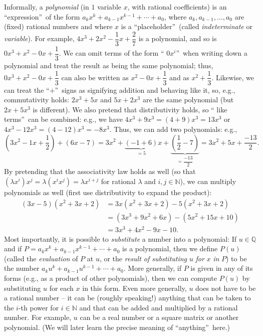\documentclass[numbers=enddot,12pt,final,onecolumn,notitlepage]{scrartcl}%
\numberwithin{exer}{subsection}
\theoremstyle{definition}
\begin{document}
Informally, a \textit{polynomial} (in $1$ variable $x$, with rational
coefficients) is an \textquotedblleft expression\textquotedblright\ of the
form $a_{k}x^{k}+a_{k-1}x^{k-1}+\cdots+a_{0}$, where $a_{k},a_{k-1}%
,\ldots,a_{0}$ are (fixed) rational numbers and where $x$ is a
\textquotedblleft placeholder\textquotedblright\ (called
\textit{indeterminate} or \textit{variable}). For example, $4x^{3}%
+2x^{2}-\dfrac{1}{3}x+\dfrac{2}{7}$ is a polynomial, and so is $0x^{3}%
+x^{2}-0x+\dfrac{1}{3}$. We can omit terms of the form \textquotedblleft%
$0x^{i}$\textquotedblright\ when writing down a polynomial and treat the
result as being the same polynomial; thus, $0x^{3}+x^{2}-0x+\dfrac{1}{3}$ can
also be written as $x^{2}-0x+\dfrac{1}{3}$ and as $x^{2}+\dfrac{1}{3}$.
Likewise, we can treat the \textquotedblleft$+$\textquotedblright\ signs as
signifying addition and behaving like it, so, e.g., commutativity holds:
$2x^{3}+5x$ and $5x+2x^{3}$ are the same polynomial (but $2x+5x^{3}$ is
different). We also pretend that distributivity holds, so \textquotedblleft
like terms\textquotedblright\ can be combined: e.g., we have $4x^{3}%
+9x^{3}=\left(  4+9\right)  x^{3}=13x^{3}$ or $4x^{3}-12x^{3}=\left(
4-12\right)  x^{3}=-8x^{3}$. Thus, we can add two polynomials: e.g.,%
\[
\left(  3x^{2}-1x+\dfrac{1}{2}\right)  +\left(  6x-7\right)  =3x^{2}%
+\underbrace{\left(  -1+6\right)  }_{=5}x+\underbrace{\left(  \dfrac{1}%
{2}-7\right)  }_{=\dfrac{-13}{2}}=3x^{2}+5x+\dfrac{-13}{2}.
\]
By pretending that the associativity law holds as well (so that $\left(
\lambda x^{i}\right)  x^{j}=\lambda\left(  x^{i}x^{j}\right)  =\lambda
x^{i+j}$ for rational $\lambda$ and $i,j\in\mathbb{N}$), we can multiply
polynomials as well (first use distributivity to expand the product):%
\begin{align*}
\left(  3x-5\right)  \left(  x^{2}+3x+2\right)   &  =3x\left(  x^{2}%
+3x+2\right)  -5\left(  x^{2}+3x+2\right) \\
&  =\left(  3x^{3}+9x^{2}+6x\right)  -\left(  5x^{2}+15x+10\right) \\
&  =3x^{3}+4x^{2}-9x-10.
\end{align*}
Most importantly, it is possible to \textit{substitute} a number into a
polynomial: If $u\in\mathbb{Q}$ and if $P=a_{k}x^{k}+a_{k-1}x^{k-1}%
+\cdots+a_{0}$ is a polynomial, then we define $P\left(  u\right)  $ (called
the \textit{evaluation} of $P$ at $u$, or the \textit{result of substituting
}$u$ \textit{for }$x$ \textit{in} $P$) to be the number $a_{k}u^{k}%
+a_{k-1}u^{k-1}+\cdots+a_{0}$. More generally, if $P$ is given in any of its
forms (e.g., as a product of other polynomials), then we can compute $P\left(
u\right)  $ by substituting $u$ for each $x$ in this form. Even more
generally, $u$ does not have to be a rational number -- it can be (roughly
speaking!) anything that can be taken to the $i$-th power for $i\in\mathbb{N}$
and that can be added and multiplied by a rational number. For example, $u$
can be a real number or a square matrix or another polynomial. (We will later
learn the precise meaning of \textquotedblleft anything\textquotedblright\ here.)
\end{document}
